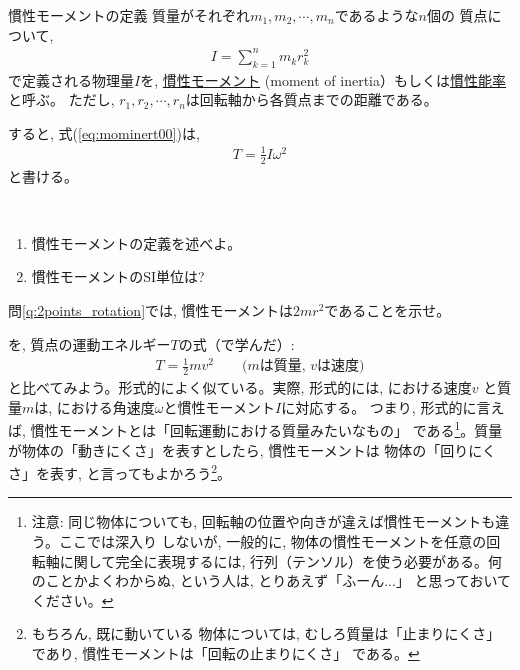 \begin{itembox}{慣性モーメントの定義}
質量がそれぞれ$m_1, m_2, \cdots, m_n$であるような$n$個の
質点について,
\begin{eqnarray}
I=\sum_{k=1}^{n}m_k^{\,}r_k^2\label{eq:mominert_def}
\end{eqnarray}
で定義される物理量$I$を, \underline{慣性モーメント}
(moment of inertia）もしくは\underline{慣性能率}と呼ぶ。
ただし, $r_1, r_2, \cdots, r_n$は回転軸から各質点までの距離である。 
\end{itembox}

すると, 式(\ref{eq:mominert00})は, 
\begin{eqnarray}
T=\frac{1}{2}I\omega^2\label{eq:mominert}
\end{eqnarray}
と書ける。
\mv

%
\begin{q}\label{q:mominert_def}　
\begin{enumerate}
\item 慣性モーメントの定義を述べよ。
\item 慣性モーメントのSI単位は?
\end{enumerate}
\end{q}
\mv

%
\begin{q}\label{q:mominert_2points_rotation}
問\ref{q:2points_rotation}では, 慣性モーメントは$2mr^2$であることを示せ。
\end{q}
\mv

を, 質点の運動エネルギー$T$の式（で学んだ）:
\begin{eqnarray}
T=\frac{1}{2}mv^2\quad\quad\text{($m$は質量, $v$は速度)}\label{eq:kineticEnergy9}
\end{eqnarray}
と比べてみよう。形式的によく似ている。実際, 形式的には, における速度$v$
と質量$m$は, における角速度$\omega$と慣性モーメント$I$に対応する。
つまり, 形式的に言えば, 慣性モーメントとは「回転運動における質量みたいなもの」
である\footnote{注意: 同じ物体についても, 回転軸の位置や向きが違えば慣性モーメントも違う。ここでは深入り
しないが, 一般的に, 物体の慣性モーメントを任意の回転軸に関して完全に表現するには, 
行列（テンソル）を使う必要がある。何のことかよくわからぬ, という人は, とりあえず「ふーん...」
と思っておいてください。}。質量が物体の「動きにくさ」を表すとしたら, 慣性モーメントは
物体の「回りにくさ」を表す, と言ってもよかろう\footnote{もちろん, 既に動いている
物体については, むしろ質量は「止まりにくさ」であり, 慣性モーメントは「回転の止まりにくさ」
である。}。\mv

